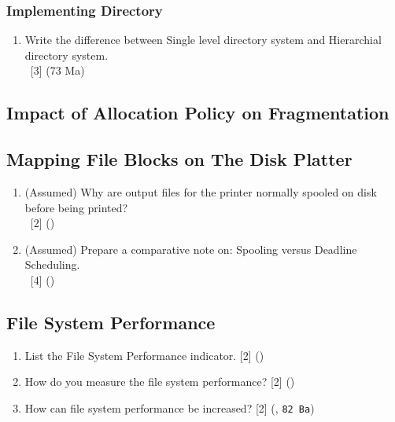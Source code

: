 \documentclass[12pt]{article}
\newcommand{\enter}{\\\textcolor{white}{1}}
\begin{document}
		\subsubsection{Implementing Directory}
			\begin{enumerate}[noitemsep, topsep=0pt]
				\item Write the difference between Single level directory system and Hierarchial directory system.
				\enter\hfill [3] (73 Ma)
			\end{enumerate}

	\subsection{Impact of Allocation Policy on Fragmentation}
	\subsection{Mapping File Blocks on The Disk Platter}
		\begin{enumerate}[noitemsep, topsep=0pt]
			\item (Assumed) Why are output files for the printer normally spooled on disk before being printed?
			\enter\hfill [2] ()

			\item (Assumed) Prepare a comparative note on: Spooling versus Deadline Scheduling.
			\enter\hfill [4] ()
		\end{enumerate}
		
	\subsection{File System Performance}
		\begin{enumerate}[noitemsep, topsep=0pt]
			\item List the File System Performance indicator. \hfill [2] ()

			\item How do you measure the file system performance? \hfill [2] ()
			
			\item How can file system performance be increased? \hfill [2] (, \texttt{82 Ba})
		\end{enumerate}
\end{document}
